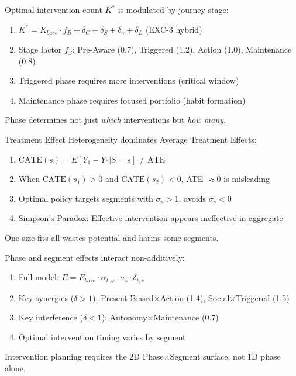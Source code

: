 \begin{theorem}
Optimal intervention count $K^*$ is modulated by journey stage:
\begin{enumerate}
\item $K^* = K_{base} \cdot f_B + \delta_C + \delta_S + \delta_\gamma + \delta_L$ (EXC-3 hybrid)
\item Stage factor $f_S$: Pre-Aware (0.7), Triggered (1.2), Action (1.0), Maintenance (0.8)
\item Triggered phase requires more interventions (critical window)
\item Maintenance phase requires focused portfolio (habit formation)
\end{enumerate}
Phase determines not just \textit{which} interventions but \textit{how many}.
\end{theorem}

\begin{theorem}
Treatment Effect Heterogeneity dominates Average Treatment Effects:
\begin{enumerate}
\item $\text{CATE}(s) = E[Y_1 - Y_0 | S = s] \neq \text{ATE}$
\item When $\text{CATE}(s_1) > 0$ and $\text{CATE}(s_2) < 0$, ATE $\approx 0$ is misleading
\item Optimal policy targets segments with $\sigma_s > 1$, avoids $\sigma_s < 0$
\item Simpson's Paradox: Effective intervention appears ineffective in aggregate
\end{enumerate}
One-size-fits-all wastes potential and harms some segments.
\end{theorem}

\begin{theorem}
Phase and segment effects interact non-additively:
\begin{enumerate}
\item Full model: $E = E_{base} \cdot \alpha_{t,\varphi} \cdot \sigma_s \cdot \delta_{t,s}$
\item Key synergies ($\delta > 1$): Present-Biased$\times$Action (1.4), Social$\times$Triggered (1.5)
\item Key interference ($\delta < 1$): Autonomy$\times$Maintenance (0.7)
\item Optimal intervention timing varies by segment
\end{enumerate}
Intervention planning requires the 2D Phase$\times$Segment surface, not 1D phase alone.
\end{theorem}


